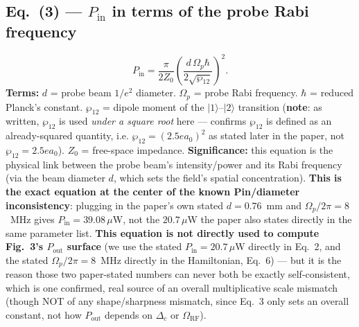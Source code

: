 \documentclass[11pt]{article}
\begin{document}
\subsection*{Eq.~(3) --- $P_\text{in}$ in terms of the probe Rabi frequency}
\begin{equation}
P_\text{in} = \frac{\pi}{2Z_0}\left(\frac{d\,\Omega_p\hbar}{2\sqrt{\wp_{12}}}\right)^2. \tag{3}
\end{equation}
\textbf{Terms:} $d$ = probe beam $1/e^2$ diameter. $\Omega_p$ = probe
Rabi frequency. $\hbar$ = reduced Planck's constant. $\wp_{12}$ = dipole
moment of the $|1\rangle$--$|2\rangle$ transition (\textbf{note}: as
written, $\wp_{12}$ is used \emph{under a square root} here --- confirms
$\wp_{12}$ is defined as an already-squared quantity, i.e.
$\wp_{12}=(2.5ea_0)^2$ as stated later in the paper, not
$\wp_{12}=2.5ea_0$). $Z_0$ = free-space impedance.
\textbf{Significance:} this equation is the physical link between the
probe beam's intensity/power and its Rabi frequency (via the beam
diameter $d$, which sets the field's spatial concentration). \textbf{This
is the exact equation at the center of the known Pin/diameter
inconsistency}: plugging in the paper's own stated $d=0.76$~mm and
$\Omega_p/2\pi=8$~MHz gives $P_\text{in}=39.08\,\mu$W, not the
$20.7\,\mu$W the paper also states directly in the same parameter list.
\textbf{This equation is not directly used to compute Fig.~3's
$P_\text{out}$ surface} (we use the stated $P_\text{in}=20.7\,\mu$W
directly in Eq.~2, and the stated $\Omega_p/2\pi=8$~MHz directly in the
Hamiltonian, Eq.~6) --- but it is the reason those two paper-stated
numbers can never both be exactly self-consistent, which is one
confirmed, real source of an overall multiplicative scale mismatch
(though NOT of any shape/sharpness mismatch, since Eq.~3 only sets an
overall constant, not how $P_\text{out}$ depends on $\Delta_c$ or
$\Omega_\text{RF}$).
\end{document}
